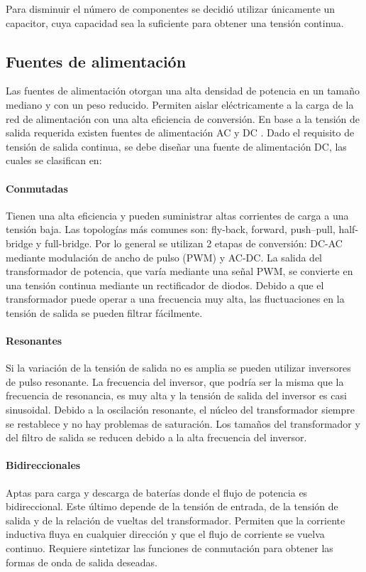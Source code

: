 Para disminuir el número de componentes se decidió utilizar únicamente
un capacitor, cuya capacidad sea la suficiente para obtener una tensión continua.

\subsection{Fuentes de alimentación}

Las fuentes de alimentación otorgan una alta densidad de potencia en un tamaño mediano y con un peso reducido.  
Permiten aislar eléctricamente a la carga de la red de alimentación con una alta eficiencia de conversión.  
En base a la tensión de salida requerida existen fuentes de alimentación AC y DC \cite{rashid}.
Dado el requisito de tensión de salida continua, se debe diseñar una fuente de alimentación DC, las cuales se clasifican en:

\paragraph{Conmutadas}
Tienen una alta eficiencia y pueden suministrar altas corrientes de carga a una tensión baja.
Las topologías más comunes son: fly-back, forward, push–pull, half-bridge y full-bridge.
Por lo general se utilizan 2 etapas de conversión: DC-AC mediante modulación de ancho de pulso (PWM) y AC-DC.
La salida del transformador de potencia, que varía mediante una señal PWM, se convierte en una tensión continua mediante un rectificador de diodos. 
Debido a que el transformador puede operar a una frecuencia muy alta, las fluctuaciones en la tensión de salida se pueden filtrar fácilmente.

\paragraph{Resonantes}
Si la variación de la tensión de salida no es amplia se pueden utilizar inversores de pulso resonante. 
La frecuencia del inversor, que podría ser la misma que la frecuencia de resonancia, es muy alta y la tensión de salida del inversor es casi sinusoidal.
Debido a la oscilación resonante, el núcleo del transformador siempre se restablece y no hay problemas de saturación. 
Los tamaños del transformador y del filtro de salida se reducen debido a la alta frecuencia del inversor.

\paragraph{Bidireccionales}
Aptas para carga y descarga de baterías donde el flujo de potencia es bidireccional.
Este último depende de la tensión de entrada, de la tensión de salida y de la relación de vueltas del transformador. 
Permiten que la corriente inductiva fluya en cualquier dirección y que el flujo de corriente se vuelva continuo.
Requiere sintetizar las funciones de conmutación para obtener las formas de onda de salida deseadas.\\

